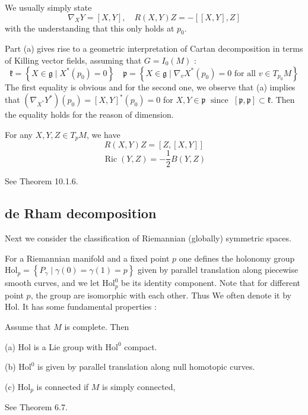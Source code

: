   We usually simply state
 \[
 \nabla_{X} Y = [X, Y], \quad R(X, Y) Z = -[[X, Y], Z]
 \]
 with the understanding that this only holds at $p_{0}$.

\begin{remark}
	Part (a) gives rise to a geometric interpretation of 
	Cartan decomposition in terms of Killing vector fields,
	assuming that $G={I}_{0}(M)$ :
	\[
	\mathfrak{k} = \left\{X \in \mathfrak{g} \mid X^{*}\left(
	p_{0} \right) = 0 \right\} \quad \mathfrak{p} = \left\{X \in
	\mathfrak{g} \mid \nabla_{v} X^{*}\left(p_{0}\right) = 0
	\text { for all } v \in T_{p_{0}} M \right\}
	\]
	The first equality is obvious and for the second one, we
	observe that (a) implies that $\left( \nabla_{X^{*}} Y^{*}
	\right)\left( p_{0} \right) = [X, Y]^{*}\left( p_{0}
	\right)=0$ for $X, Y \in \mathfrak{p} \operatorname{\ since\
	}[\mathfrak{p}, \mathfrak{p}] \subset \mathfrak{k}$.
	Then the equality holds for the reason of dimension. 
\end{remark}

\begin{corollary}\label{geo2}
	For any $X, Y, Z \in T_{p} M$, we have
	\[
		R(X, Y) Z = [Z,[X, Y]] 
	\]
	\[
		\operatorname{Ric}(Y, Z) = -\frac{1}{2} B(Y, Z)
	\]
\end{corollary}
\bproof
See \cite{Peter} Theorem 10.1.6.
\eproof
\subsection{de Rham decomposition}

Next we consider the classification of  Riemannian (globally)
symmetric spaces.

For a Riemannian manifold and a fixed point $p$ one defines the
holonomy group $\mathrm{Hol}_{p} = \left\{P_{\gamma} \mid
\gamma(0) = \gamma(1) = p\right\}$ given by parallel translation
along piecewise smooth curves, and we let $\mathrm{Hol}_{p}^{0}$
be its identity component. Note that for different point $p$, the
group are isomorphic with each other. Thus We  often denote it by
Hol. It has some fundamental properties :
\begin{theorem}
	Assume that $M$ is complete. Then
	
	(a) $\mathrm{Hol}$ is a Lie group with  $\mathrm{Hol}^{0}$
	compact.
	
	(b) $\mathrm{Hol}^0$ is given by parallel translation along
	null homotopic curves.
	
	(c) $\mathrm{Hol}_{p}$ is connected if $M$ is simply
	connected,
\end{theorem}
\bproof
See \cite{Ziller} Theorem 6.7.
\eproof

